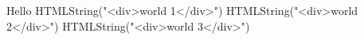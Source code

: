 Hello HTML{String}("<div>world 1</div>") HTML{String}("<div>world 2</div>") HTML{String}("<div>world 3</div>") \par
